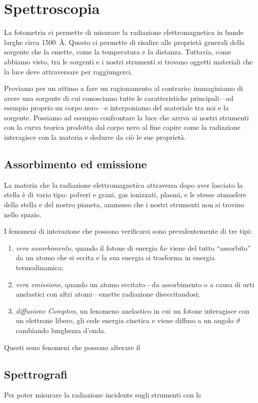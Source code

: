 \chapter{Spettroscopia}
    La fotometria ci permette di misurare la radiazione elettromagnetica in bande larghe circa \SI{1500}{\angstrom}. Questo ci permette di risalire alle proprietà generali della sorgente che la emette, come la temperatura e la distanza. Tuttavia, come abbiamo visto, tra le sorgenti e i nostri strumenti si trovano oggetti materiali che la luce deve attraversare per raggiungerci.
    
    Proviamo per un attimo a fare un ragionamento al contrario: immaginiamo di avere una sorgente di cui conosciamo tutte le caratteristiche principali---ad esempio proprio un corpo nero---e interponiamo del materiale tra noi e la sorgente. Possiamo ad esempio confrontare la luce che arriva ai nostri strumenti con la curva teorica prodotta dal corpo nero al fine capire come la radiazione interagisce con la materia e dedurre da ciò le sue proprietà.
\section{Assorbimento ed emissione}
    La materia che la radiazione elettromagnetica attraversa dopo aver lasciato la stella è di vario tipo: polveri e grani, gas ionizzati, plasmi, e le stesse atmosfere della stella e del nostro pianeta, ammesso che i nostri strumenti non si trovino nello spazio.

    I fenomeni di interazione che possono verificarsi sono prevalentemente di tre tipi:
    \begin{enumerate}[label=\ding{70}]
        \item \emph{vero assorbimento}, quando il fotone di energia $h\nu$ viene del tutto ``assorbito'' da un atomo che si eccita e la sua energia si trasforma in energia termodinamica;
        \item \emph{vera emissione}, quando un atomo eccitato---da assorbimento o a causa di urti anelastici con altri atomi---emette radiazione diseccitandosi;
        \item \emph{diffusione Compton}, un fenomeno anelastico in cui un fotone interagisce con un elettrone libero, gli cede energia cinetica e viene diffuso a un angolo $\vartheta$ cambiando lunghezza d'onda.
    \end{enumerate}
    Questi sono fenomeni che possono alterare il 
\section{Spettrografi}
    Per poter misurare la radiazione incidente sugli strumenti con le
